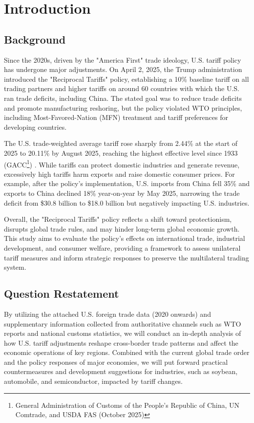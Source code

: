 \documentclass{apmcmthesis}
\begin{document}
{
  \setlength{\parskip}{0pt}
  \tableofcontents
}






\newpage
\pagestyle{mainmatterstyle}
\setcounter{page}{1}

\section{Introduction}
\subsection{Background}
Since the 2020s, driven by the "America First" trade ideology, U.S. tariff policy has undergone major adjustments. On April 2, 2025, the Trump administration introduced the "Reciprocal Tariffs" policy, establishing a 10\% baseline tariff on all trading partners and higher tariffs on around 60 countries with which the U.S. ran trade deficits, including China. The stated goal was to reduce trade deficits and promote manufacturing reshoring, but the policy violated WTO principles, including Most-Favored-Nation (MFN) treatment and tariff preferences for developing countries.

The U.S. trade-weighted average tariff rose sharply from 2.44\% at the start of 2025 to 20.11\% by August 2025, reaching the highest effective level since 1933 (GACC\footnote{\cite{GACC} General Administration of Customs of the People's Republic of China, UN Comtrade, and USDA FAS (October 2025)})
. While tariffs can protect domestic industries and generate revenue, excessively high tariffs harm exports and raise domestic consumer prices. For example, after the policy's implementation, U.S. imports from China fell 35\% and exports to China declined 18\% year-on-year by May 2025, narrowing the trade deficit from \$30.8 billion to \$18.0 billion but negatively impacting U.S. industries.

Overall, the "Reciprocal Tariffs" policy reflects a shift toward protectionism, disrupts global trade rules, and may hinder long-term global economic growth. This study aims to evaluate the policy's effects on international trade, industrial development, and consumer welfare, providing a framework to assess unilateral tariff measures and inform strategic responses to preserve the multilateral trading system.

\subsection{Question Restatement}
By utilizing the attached U.S. foreign trade data (2020 onwards) and supplementary information collected from authoritative channels such as WTO reports and national customs statistics, we will conduct an in-depth analysis of how U.S. tariff adjustments reshape cross-border trade patterns and affect the economic operations of key regions. Combined with the current global trade order and the policy responses of major economies, we will put forward practical countermeasures and development suggestions for industries, such as soybean, automobile, and semiconductor, impacted by tariff changes.
\end{document}
